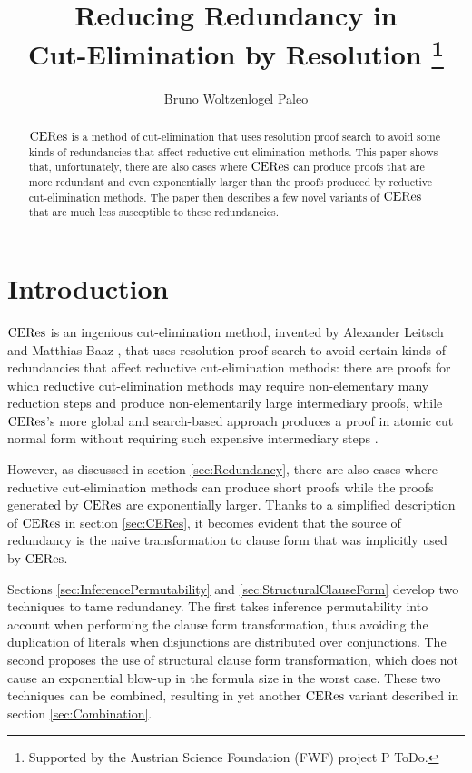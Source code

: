 \documentclass{llncs}
\title{
  Reducing Redundancy in \\ Cut-Elimination by Resolution
  \thanks{Supported by the Austrian Science Foundation (FWF) project P ToDo.}
}
\author{
  Bruno Woltzenlogel Paleo%
}
\institute{
  Theory and Logic Group, Vienna University of Technology, Vienna, Austria \\
  \email{bruno@logic.at}
}
\begin{document}
\maketitle



\begin{abstract}
$\mathrm{CERes}$ is a method of cut-elimination that uses resolution proof search to avoid some kinds of redundancies that affect reductive cut-elimination methods. This paper shows that, unfortunately, there are also cases where $\mathrm{CERes}$ can produce proofs that are more redundant and even exponentially larger than the proofs produced by reductive cut-elimination methods. The paper then describes a few novel variants of $\mathrm{CERes}$ that are much less susceptible to these redundancies.
\end{abstract}



\section{Introduction}

$\mathrm{CERes}$ is an ingenious cut-elimination method, invented by Alexander Leitsch and Matthias Baaz \cite{BaazLeitsch1999MethodsofCut-Elimination,BaazLeitsch2000Cut-eliminationandRedundancy-eliminationbyResolution,BaazLeitsch2006Towardsaclausalanalysisofcut-elimination}, that uses resolution proof search to avoid certain kinds of redundancies that affect reductive cut-elimination methods: there are proofs for which reductive cut-elimination methods may require non-elementary many reduction steps and produce non-elementarily large intermediary proofs, while $\mathrm{CERes}$'s more global and search-based approach produces a proof in atomic cut normal form without requiring such expensive intermediary steps \cite{BaazLeitsch2009MethodsofCut-Elimination}. 

However, as discussed in section \ref{sec:Redundancy}, there are also cases where reductive cut-elimination methods can produce short proofs while the proofs generated by $\mathrm{CERes}$ are exponentially larger. Thanks to a simplified description of $\mathrm{CERes}$ in section \ref{sec:CERes}, it becomes evident that the source of redundancy is the naive transformation to clause form that was implicitly used by $\mathrm{CERes}$.

Sections \ref{sec:InferencePermutability} and \ref{sec:StructuralClauseForm} develop two techniques to tame redundancy. The first takes inference permutability into account when performing the clause form transformation, thus avoiding the duplication of literals when disjunctions are distributed over conjunctions. The second proposes the use of structural clause form transformation, which does not cause an exponential blow-up in the formula size in the worst case. These two techniques can be combined, resulting in yet another $\mathrm{CERes}$ variant described in section \ref{sec:Combination}.
\end{document}

